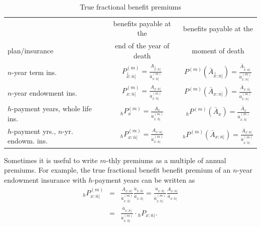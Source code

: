 \documentclass[11pt,fleqn,oneside]{book}
\begin{document}
\begin{table}
\begin{center}
\footnotesize
\begin{tabular}{|| l | c c ||}
\hline
\hline
 & benefits payable at the & benefits payable at the \\
 plan/insurance & end of the year of death & moment of death\\
 \hline
 $n$-year term ins.					&$P^{(m)}_{\stackrel{1}{x}:\overline{n}|} = \frac{A_{\stackrel{1}{x}:\overline{n}|}}{\ddot{a}_{x:\overline{n}|}^{(m)}}$ 	
 & $P^{(m)}\left(\bar{A}_{\stackrel{1}{x}:\overline{n}|}\right) = \frac{\bar{A}_{\stackrel{1}{x}:\overline{n}|}}{\ddot{a}_{x:\overline{n}|}^{(m)}}$ \\
 $n$-year endowment ins.			&$P^{(m)}_{x:\overline{n}|} = \frac{A_{x:\overline{n}|}}{\ddot{a}_{x:\overline{n}|}^{(m)}}$ 	
 & $P^{(m)}\left(\bar{A}_{x:\overline{n}|}\right) = \frac{\bar{A}_{x:\overline{n}|}}{\ddot{a}_{x:\overline{n}|}^{(m)}}$ \\
 $h$-payment years, whole life ins.		&$_hP^{(m)}_{x} = \frac{A_{x}}{\ddot{a}_{x:\overline{h}|}^{(m)}}$	
 & $_hP^{(m)}\left(\bar{A}_x\right) = \frac{\bar{A}_{x}}{\ddot{a}_{x:\overline{h}|}^{(m)}}$ \\
 $h$-payment yrs., $n$-yr. endowm. ins.	&$_hP^{(m)}_{x:\overline{n}|} = \frac{A_{x:\overline{n}|}}{\ddot{a}_{x:\overline{n}|}^{(m)}}$ 	
 & $_hP^{(m)}\left(\bar{A}_{x:\overline{n}|}\right) = \frac{\bar{A}_{x:\overline{n}|}}{\ddot{a}_{x:\overline{h}|}^{(m)}}$ \\
 \hline
 \hline
 \end{tabular}
 \end{center}
\normalsize
\caption{True fractional benefit premiums\label{TABMTHLYPREM}}
\end{table}

Sometimes it is useful to write $m$-thly premiums as a multiple of annual premiums. For example, the true fractional benefit benefit premium of an $n$-year endowment insurance with $h$-payment years can be written as
\begin{eqnarray*}
{_hP^{(m)}_{x:\overline{n}|}} &=& \frac{A_{x:\overline{n}|}}{\ddot{a}^{(m)}_{x:\overline{h}|}} \frac{\ddot{a}_{x:\overline{h}|}}{\ddot{a}_{x:\overline{h}|}} =\frac{\ddot{a}_{x:\overline{h}|}}{\ddot{a}^{(m)}_{x:\overline{h}|}}  \frac{A_{x:\overline{n}|}}{\ddot{a}_{x:\overline{h}|}} \\
&=&\frac{\ddot{a}_{x:\overline{h}|}}{\ddot{a}^{(m)}_{x:\overline{h}|}}  \cdot {_hP_{x:\overline{n}|}}.
\end{eqnarray*}
\end{document}
